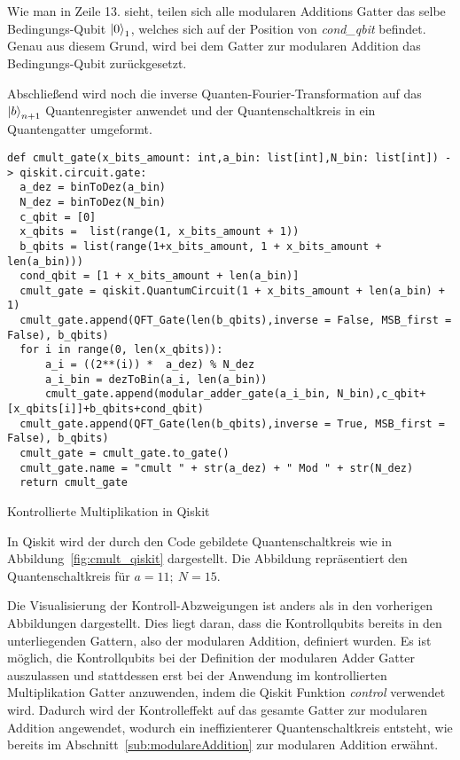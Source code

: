 Wie man in Zeile 13. sieht, teilen sich alle modularen Additions Gatter das selbe Bedingungs-Qubit \(\ket{0}_1\), 
welches sich auf der Position von \textit{cond\_qbit} befindet.
Genau aus diesem Grund, wird bei dem Gatter zur modularen Addition das Bedingungs-Qubit zurückgesetzt.

Abschließend wird noch die inverse Quanten-Fourier-Transformation auf das \(\ket{b}_{n+1}\) Quantenregister anwendet und 
der Quantenschaltkreis in ein Quantengatter umgeformt.

\begin{listing}[H]

\begin{verbatim}
def cmult_gate(x_bits_amount: int,a_bin: list[int],N_bin: list[int]) -> qiskit.circuit.gate:  
  a_dez = binToDez(a_bin)
  N_dez = binToDez(N_bin)
  c_qbit = [0]
  x_qbits =  list(range(1, x_bits_amount + 1))
  b_qbits = list(range(1+x_bits_amount, 1 + x_bits_amount + len(a_bin)))
  cond_qbit = [1 + x_bits_amount + len(a_bin)]
  cmult_gate = qiskit.QuantumCircuit(1 + x_bits_amount + len(a_bin) + 1)
  cmult_gate.append(QFT_Gate(len(b_qbits),inverse = False, MSB_first = False), b_qbits)
  for i in range(0, len(x_qbits)):
      a_i = ((2**(i)) *  a_dez) % N_dez
      a_i_bin = dezToBin(a_i, len(a_bin))
      cmult_gate.append(modular_adder_gate(a_i_bin, N_bin),c_qbit+[x_qbits[i]]+b_qbits+cond_qbit)
  cmult_gate.append(QFT_Gate(len(b_qbits),inverse = True, MSB_first = False), b_qbits)
  cmult_gate = cmult_gate.to_gate()
  cmult_gate.name = "cmult " + str(a_dez) + " Mod " + str(N_dez)
  return cmult_gate
  \end{verbatim}
  \caption{Kontrollierte Multiplikation in Qiskit}
  \label{code:ModularMultiplication}
\end{listing}

In Qiskit wird der durch den Code gebildete Quantenschaltkreis wie in Abbildung~\ref{fig:cmult_qiskit} dargestellt.
Die Abbildung repräsentiert den Quantenschaltkreis für \(a = 11;~N = 15\).

Die Visualisierung der Kontroll-Abzweigungen ist anders als in den vorherigen Abbildungen dargestellt.
Dies liegt daran, dass die Kontrollqubits bereits in den unterliegenden Gattern, 
also der modularen Addition, 
definiert wurden.
Es ist möglich, die Kontrollqubits bei der Definition der modularen Adder Gatter auszulassen und 
stattdessen erst bei der Anwendung im kontrollierten Multiplikation Gatter anzuwenden, 
indem die Qiskit Funktion \textit{control} verwendet wird.
Dadurch wird der Kontrolleffekt auf das gesamte Gatter zur modularen Addition angewendet, 
wodurch ein ineffizienterer Quantenschaltkreis entsteht, 
wie bereits im Abschnitt~\ref{sub:modulareAddition} zur modularen Addition erwähnt.

